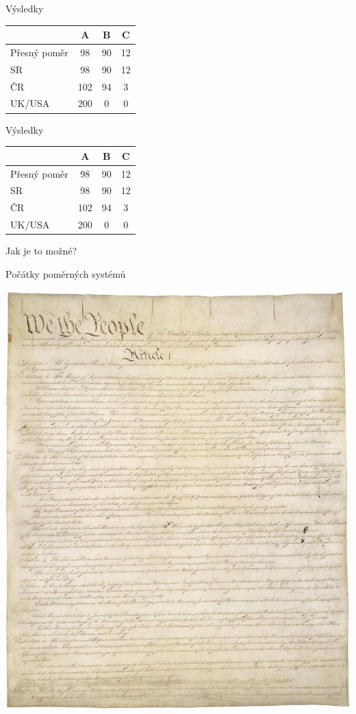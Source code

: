 \documentclass[17pt]{beamer}
\begin{document}
\begin{frame}{Výsledky}
\begin{center}
\begin{tabular}{|l|c|c|c|} \hline
  & A & B & C \\ \hline 
Přesný poměr & 98 & 90 & 12\\ \hline
SR & 98 & 90 & 12\\ \hline
ČR & 102 & 94 & 3\\ \hline
UK/USA & 200 & 0 & 0\\ \hline
\end{tabular}
\end{center} 
\end{frame}

\begin{frame}{Výsledky}
\begin{center}
\begin{tabular}{|l|c|c|c|} \hline
  & A & B & C \\ \hline 
Přesný poměr & 98 & 90 & 12\\ \hline
SR & 98 & 90 & 12\\ \hline
ČR & 102 & 94 & 3\\ \hline
UK/USA & 200 & 0 & 0\\ \hline
\end{tabular}
\end{center} 
Jak je to možné?
\end{frame}

\begin{frame}{Počátky poměrných systémů}
\begin{center}
\includegraphics[scale=0.2]{zdroje/const.jpg}
\end{center}
\end{frame}
\end{document}
